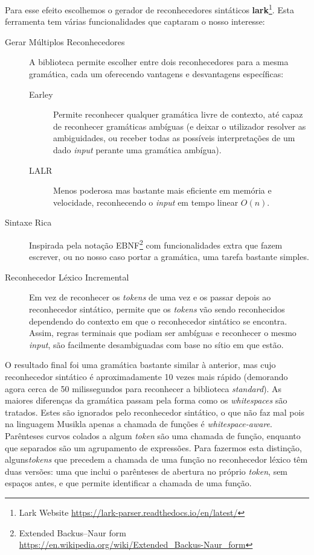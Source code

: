 Para esse efeito escolhemos o gerador de reconhecedores sintáticos \textbf{lark}\footnote{Lark Website \url{https://lark-parser.readthedocs.io/en/latest/}}. Esta ferramenta tem várias funcionalidades que captaram o nosso interesse:
\begin{description}
 \item[Gerar Múltiplos Reconhecedores] A biblioteca permite escolher entre dois reconhecedores para a mesma gramática, cada um oferecendo vantagens e desvantagens específicas:
    \begin{description}
     \item[Earley] Permite reconhecer qualquer gramática livre de contexto, até capaz de reconhecer gramáticas ambíguas (e deixar o utilizador resolver as ambiguidades, ou receber todas as possíveis interpretações de um dado \textit{input} perante uma gramática ambígua).
     \item[LALR] Menos poderosa mas bastante mais eficiente em memória e velocidade, reconhecendo o \textit{input} em tempo linear $O(n)$.
    \end{description}
 \item[Sintaxe Rica] Inspirada pela notação EBNF\footnote{Extended Backus–Naur form \url{https://en.wikipedia.org/wiki/Extended\_Backus-Naur\_form}} com funcionalidades extra que fazem escrever, ou no nosso caso portar a gramática, uma tarefa bastante simples. 
 \item[Reconhecedor Léxico Incremental] Em vez de reconhecer os \textit{tokens} de uma vez e os passar depois ao reconhecedor sintático, permite que os \textit{tokens} vão sendo reconhecidos dependendo do contexto em que o reconhecedor sintático se encontra. Assim, regras terminais que podiam ser ambíguas e reconhecer o mesmo \textit{input}, são facilmente desambiguadas com base no sítio em que estão.
\end{description}

O resultado final foi uma gramática bastante similar à anterior, mas cujo reconhecedor sintático é aproximadamente 10 vezes mais rápido (demorando agora cerca de 50 milissegundos para reconhecer a biblioteca \textit{standard}). As maiores diferenças da gramática passam pela forma como os \textit{whitespaces} são tratados. Estes são ignorados pelo reconhecedor sintático, o que não faz mal pois na linguagem Musikla apenas a chamada de funções é \textit{whitespace-aware}. Parênteses curvos colados a algum \textit{token} são uma chamada de função, enquanto que separados são um agrupamento de expressões. Para fazermos esta distinção, alguns\textit{tokens} que precedem a chamada de uma função no reconhecedor léxico têm duas versões: uma que inclui o parênteses de abertura no próprio \textit{token}, sem espaços antes, e que permite identificar a chamada de uma função.

